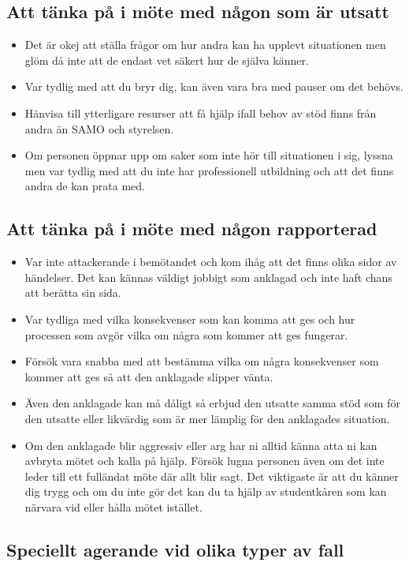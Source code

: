 \documentclass[a4paper]{dtek}
\begin{document}
\subsection{Att tänka på i möte med någon som är utsatt}
\begin{itemize}
    \item Det är okej att ställa frågor om hur andra kan ha upplevt situationen men glöm då inte att de endast vet säkert hur de själva känner.
    \item Var tydlig med att du bryr dig, kan även vara bra med pauser om det behövs.
    \item Hänvisa till ytterligare resurser att få hjälp ifall behov av stöd finns från andra än SAMO och styrelsen.
    \item Om personen öppnar upp om saker som inte hör till situationen i sig, lyssna men var tydlig med att du inte har professionell utbildning och att det finns andra de kan prata med.
\end{itemize}

\subsection{Att tänka på i möte med någon rapporterad}
\begin{itemize}
    \item Var inte attackerande i bemötandet och kom ihåg att det finns olika sidor av händelser. Det kan kännas väldigt jobbigt som anklagad och inte haft chans att berätta sin sida.
    \item Var tydliga med vilka konsekvenser som kan komma att ges och hur processen som avgör vilka om några som kommer att ges fungerar.
    \item Försök vara snabba med att bestämma vilka om några konsekvenser som kommer att ges så att den anklagade slipper vänta.
    \item Även den anklagade kan må dåligt så erbjud den utsatte samma stöd som för den utsatte eller likvärdig som är mer lämplig för den anklagades situation.
    \item Om den anklagade blir aggressiv eller arg har ni alltid känna atta ni kan avbryta mötet och kalla på hjälp. Försök lugna personen även om det inte leder till ett fulländat möte där allt blir sagt. Det viktigaste är att du känner dig trygg och om du inte gör det kan du ta hjälp av studentkåren som kan närvara vid eller hålla mötet istället.
\end{itemize}

\subsection{Speciellt agerande vid olika typer av fall}
\end{document}
